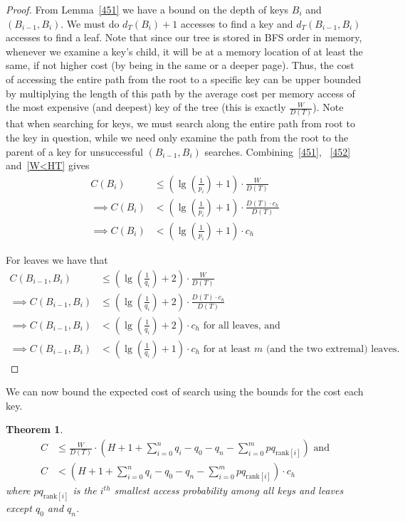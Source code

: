 \documentclass[letterpaper,12pt,titlepage,oneside,final]{book}
\theoremstyle{plain}
\newtheorem{thm}{Theorem}[section]
\begin{document}
\begin{proof}
From Lemma~\ref{451} we have a bound on the depth of keys $B_i$ and $(B_{i-1},B_i)$. We must do $d_T(B_i) + 1$ accesses to find a key and $d_T(B_{i-1},B_i)$ accesses to find a leaf. Note that since our tree is stored in BFS order in memory, whenever we examine a key's child, it will be at a memory location of at least the same, if not higher cost (by being in the same or a deeper page). Thus, the cost of accessing the entire path from the root to a specific key can be upper bounded by multiplying the length of this path by the average cost per memory access of the most expensive (and deepest) key of the tree (this is exactly $\frac{W}{D(T)}$). Note that when searching for keys, we must search along the entire path from root to the key in question, while we need only examine the path from the root to the parent of a key for unsuccessful $(B_{i-1},B_i)$ searches. Combining~\ref{451}, ~\ref{452} and~\ref{W<HT} gives
\begin{align*}
C(B_i) &\leq (\lg(\frac{1}{p_i})+1)\cdot\frac{W}{D(T)}\\
\implies C(B_i) &< (\lg(\frac{1}{p_i})+1)\cdot\frac{D(T)\cdot c_h}{D(T)}   \\
\implies C(B_i) &< (\lg(\frac{1}{p_i})+1)\cdot c_h
\end{align*}

For leaves we have that
\begin{align*}
C(B_{i-1},B_i) &\leq (\lg(\frac{1}{q_i})+2)\cdot \frac{W}{D(T)}   \\
\implies C(B_{i-1},B_i) &\leq (\lg(\frac{1}{q_i})+2)\cdot \frac{D(T)\cdot c_h}{D(T)}   \\
\implies C(B_{i-1},B_i) &< (\lg(\frac{1}{q_i})+2)\cdot c_h \text{ for all leaves, and} \\
\implies C(B_{i-1},B_i) &< (\lg(\frac{1}{q_i})+1)\cdot c_h \text{ for at least $m$ (and the two extremal) leaves}.
\end{align*}
\end{proof}

We can now bound the expected cost of search using the bounds for the cost each key.

\begin{thm} \label{ApproxMWPagingThm}
\begin{align*}
C &\leq  \frac{W}{D(T)} \cdot  \left(H + 1 + \sum_{i=0}^n q_i - q_0 - q_n - \sum_{i=0}^m pq_{\text{rank}[i]} \right) \text{ and}\\
C &< \left(H + 1 + \sum_{i=0}^n q_i - q_0 - q_n - \sum_{i=0}^m pq_{\text{rank}[i]} \right) \cdot  c_h
\end{align*}
where $pq_{\text{rank}[i]}$ is the $i^{th}$ smallest access probability among all keys and leaves except $q_0$ and $q_n$.
\end{thm}
\end{document}
